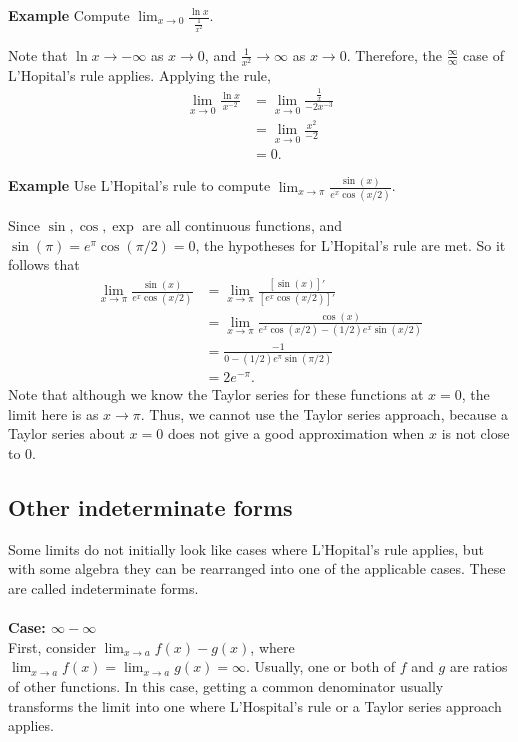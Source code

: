 \documentclass[twoside,openright,titlepage,a4paper]{book}
\begin{document}
\begin{sloppypar}
\textbf{Example} Compute $\displaystyle \lim_{x \rightarrow 0} \frac{\ln x}{\frac{1}{x^2}}$.
\begin{examplebox}
Note that $\ln x \rightarrow -\infty$ as $x \rightarrow 0$, and $\frac{1}{x^2} \rightarrow \infty$ as $x \rightarrow 0$. Therefore, the $\frac{\infty}{\infty}$ case of L'Hopital's rule applies. Applying the rule,
\begin{align*}
\lim_{x \rightarrow 0} \frac{\ln x}{x^{-2}} &= \lim_{x \rightarrow 0} \frac{\frac{1}{x}}{-2 x^{-3}} \\
&= \lim_{x\rightarrow 0} \frac{x^2}{-2} \\
&= 0.
\end{align*}
\end{examplebox}

\textbf{Example} Use L'Hopital's rule to compute $\displaystyle \lim_{x\rightarrow \pi} \frac{\sin(x)}{e^x \cos(x/2)}$. 
\begin{examplebox}
Since $\sin, \cos, \exp$ are all continuous functions, and $\sin(\pi) = e^{\pi} \cos (\pi/2) = 0$, the hypotheses for L'Hopital's rule are met. So it follows that
\begin{align*}
\lim_{x\rightarrow \pi} \frac{\sin(x)}{e^x \cos(x/2)} &= \lim_{x\rightarrow \pi} \frac{[\sin(x)]'}{[e^x \cos(x/2)]'} \\
&= \lim_{x \rightarrow \pi} \frac{\cos(x)}{e^x \cos(x/2) -(1/2)e^x\sin(x/2)} \\
&= \frac{-1}{0 - (1/2)e^{\pi} \sin(\pi/2)} \\
&= 2e^{-\pi}. 
\end{align*}
Note that although we know the Taylor series for these functions at $x=0$, the limit here is as $x \rightarrow \pi$. Thus, we cannot use the Taylor series approach, because a Taylor series about $x=0$ does not give a good approximation when $x$ is not close to 0.
\end{examplebox}

\subsection{Other indeterminate forms}
Some limits do not initially look like cases where L'Hopital's rule applies, but with some algebra they can be rearranged into one of the applicable cases. These are called indeterminate forms.\\\\
\textbf{Case: $\infty - \infty$}\\

First, consider $\displaystyle \lim_{x \rightarrow a} f(x) - g(x)$, where $\displaystyle \lim_{x \rightarrow a} f(x) = \lim_{x\rightarrow a} g(x) = \infty$. Usually, one or both of $f$ and $g$ are ratios of other functions. In this case, getting a common denominator usually transforms the limit into one where L'Hospital's rule or a Taylor series approach applies.


\end{sloppypar}
\end{document}
